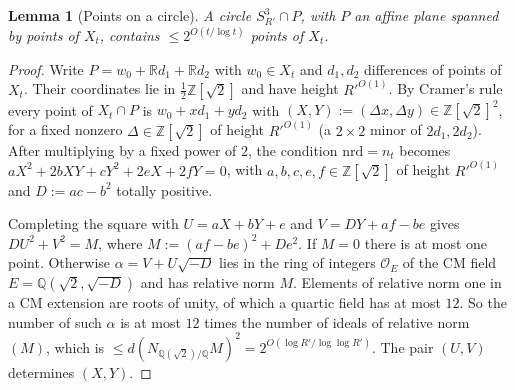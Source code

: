 \documentclass[aps,prx,twocolumn,superscriptaddress,nofootinbib,longbibliography]{revtex4-2}
\theoremstyle{plain}
\newtheorem{lemma}{Lemma}
\theoremstyle{definition}
\theoremstyle{remark}
\newcommand{\Z}{\mathbb{Z}}
\newcommand{\Q}{\mathbb{Q}}
\newcommand{\R}{\mathbb{R}}
\begin{document}
\begin{lemma}[Points on a circle]\label{lem:E5}
A circle $S^3_{R'}\cap P$, with $P$ an affine plane spanned by points of $X_t$, contains $\le2^{O(t/\log t)}$ points of $X_t$.
\end{lemma}
\begin{proof}
Write $P=w_0+\R d_1+\R d_2$ with $w_0\in X_t$ and $d_1,d_2$ differences of points of $X_t$. Their coordinates lie in $\tfrac12\Z[\sqrt2]$ and have height $R'^{O(1)}$. By Cramer's rule every point of $X_t\cap P$ is $w_0+xd_1+yd_2$ with $(X,Y):=(\Delta x,\Delta y)\in\Z[\sqrt2]^2$, for a fixed nonzero $\Delta\in\Z[\sqrt2]$ of height $R'^{O(1)}$ (a $2\times2$ minor of $2d_1,2d_2$). After multiplying by a fixed power of $2$, the condition $\mathrm{nrd}=n_t$ becomes $aX^2+2bXY+cY^2+2eX+2fY=0$, with $a,b,c,e,f\in\Z[\sqrt2]$ of height $R'^{O(1)}$ and $D:=ac-b^2$ totally positive.

Completing the square with $U=aX+bY+e$ and $V=DY+af-be$ gives $DU^2+V^2=M$, where $M:=(af-be)^2+De^2$. If $M=0$ there is at most one point. Otherwise $\alpha=V+U\sqrt{-D}$ lies in the ring of integers $\mathcal O_E$ of the CM field $E=\Q(\sqrt2,\sqrt{-D})$ and has relative norm $M$. Elements of relative norm one in a CM extension are roots of unity, of which a quartic field has at most $12$. So the number of such $\alpha$ is at most $12$ times the number of ideals of relative norm $(M)$, which is $\le d(N_{\Q(\sqrt2)/\Q}M)^2=2^{O(\log R'/\log\log R')}$. The pair $(U,V)$ determines $(X,Y)$.
\end{proof}
\end{document}
